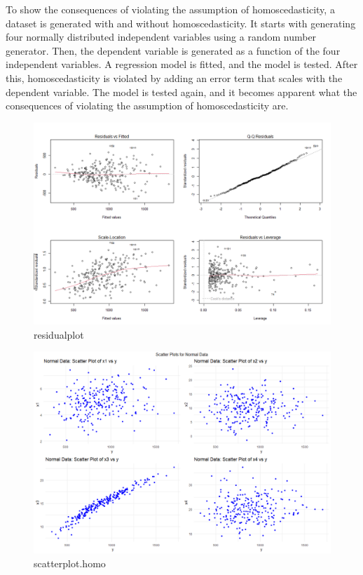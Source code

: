 To show the consequences of violating the assumption of homoscedasticity, a dataset is generated with and without homoscedasticity. It starts with generating four normally distributed independent variables using a random number generator. Then, the dependent variable is generated as a function of the four independent variables. A regression model is fitted, and the model is tested. After this, homoscedasticity is violated by adding an error term that scales with the dependent variable. The model is tested again, and it becomes apparent what the consequences of violating the assumption of homoscedasticity are.

%



\begin{figure}[h] 
	\centering\includegraphics[width=14cm]{billder/4.png}
	\caption{residualplot}
	\label{fig:j06}
\end{figure}

\begin{figure}[h] 
	\centering\includegraphics[width=14cm]{billder/5.png}
	\caption{scatterplot.homo}
	\label{fig:j06}
\end{figure}

